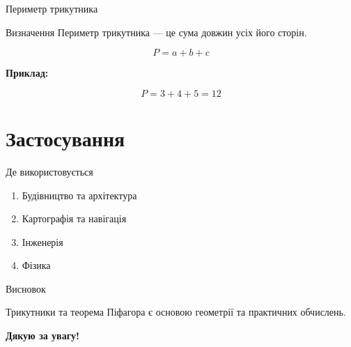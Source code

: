 \documentclass{beamer}
\begin{document}
\begin{frame}{Периметр трикутника}

\begin{block}{Визначення}
Периметр трикутника — це сума довжин усіх його сторін.
\end{block}

\[P = a + b + c\]

\vspace{0.5cm}

\textbf{Приклад:}

\[P = 3 + 4 + 5 = 12\]

\end{frame}

\section{Застосування}

\begin{frame}{Де використовується}

\begin{enumerate}
    \item Будівництво та архітектура
    \item Картографія та навігація
    \item Інженерія
    \item Фізика
\end{enumerate}

\end{frame}

\begin{frame}{Висновок}

\centering
\Large
Трикутники та теорема Піфагора  
є основою геометрії та практичних обчислень.

\vspace{1cm}

\textbf{Дякую за увагу!}

\end{frame}
\end{document}

